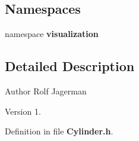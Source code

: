 \subsection*{Namespaces}
\begin{DoxyCompactItemize}
\item 
namespace {\bf visualization}
\end{DoxyCompactItemize}


\subsection{Detailed Description}
\begin{DoxyAuthor}{Author}
Rolf Jagerman 
\end{DoxyAuthor}
\begin{DoxyVersion}{Version}
1. 
\end{DoxyVersion}


Definition in file {\bf Cylinder.\-h}.

